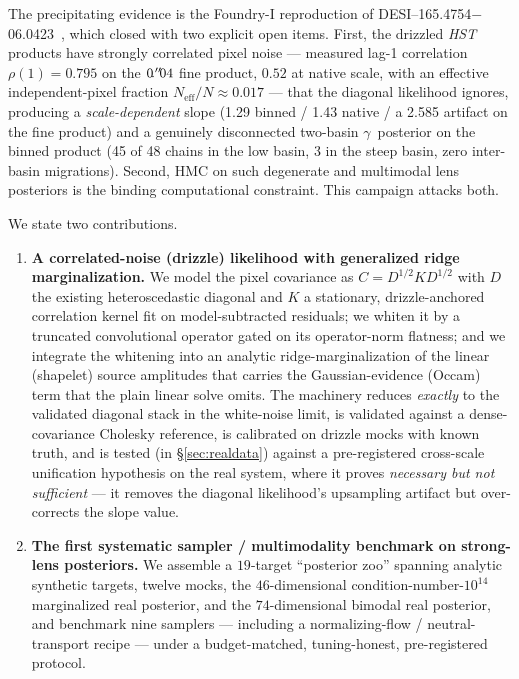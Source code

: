 \documentclass[11pt,letterpaper]{article}
\newcommand{\gammaEPL}{\ensuremath{\gamma}}
\newcommand{\Neff}{\ensuremath{N_{\mathrm{eff}}}}
\newcommand{\foundry}{DESI--165.4754$-$06.0423}
\begin{document}
The precipitating evidence is the Foundry-I reproduction of \foundry\
\citep{huang2025foundry1}, which closed with two explicit open items. First,
the drizzled {\it HST} products have strongly correlated pixel noise ---
measured lag-1 correlation $\rho(1)=0.795$ on the $0\mbox{$\!\!\,.{}^{\prime\prime}\!\!\,$}04$ fine product,
$0.52$ at native scale, with an effective independent-pixel fraction
$\Neff/N\approx0.017$ --- that the diagonal likelihood ignores, producing a
{\it scale-dependent} slope (1.29 binned / 1.43 native / a 2.585 artifact on
the fine product) and a genuinely disconnected two-basin \gammaEPL\ posterior
on the binned product (45 of 48 chains in the low basin, 3 in the steep basin,
zero inter-basin migrations). Second, HMC on such degenerate and multimodal
lens posteriors is the binding computational constraint. This campaign
attacks both.

We state two contributions.
\begin{enumerate}
\item {\bf A correlated-noise (drizzle) likelihood with generalized ridge
marginalization.} We model the pixel covariance as
$C=D^{1/2}KD^{1/2}$ with $D$ the existing heteroscedastic diagonal and $K$ a
stationary, drizzle-anchored correlation kernel fit on model-subtracted
residuals; we whiten it by a truncated convolutional operator gated on its
operator-norm flatness; and we integrate the whitening into an analytic
ridge-marginalization of the linear (shapelet) source amplitudes that carries
the Gaussian-evidence (Occam) term that the plain linear solve omits. The
machinery reduces {\it exactly} to the validated diagonal stack in the
white-noise limit, is validated against a dense-covariance Cholesky reference,
is calibrated on drizzle mocks with known truth, and is tested (in
\S\ref{sec:realdata}) against a pre-registered cross-scale unification
hypothesis on the real system, where it proves {\it necessary but not
sufficient} --- it removes the diagonal likelihood's upsampling artifact but
over-corrects the slope value.
\item {\bf The first systematic sampler / multimodality benchmark on
strong-lens posteriors.} We assemble a $19$-target ``posterior zoo'' spanning
analytic synthetic targets, twelve \citet{gu2022gigalens} mocks, the
$46$-dimensional condition-number-$10^{14}$ marginalized real posterior, and
the $74$-dimensional bimodal real posterior, and benchmark nine samplers ---
including a normalizing-flow / neutral-transport recipe --- under a
budget-matched, tuning-honest, pre-registered protocol.
\end{enumerate}
\end{document}

